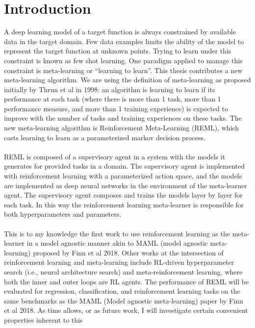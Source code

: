 \chapter{Introduction}
\label{Introduction}

\minitoc 
A deep learning model of a target function is always constrained by available data 
in the target domain. Few data examples limits the ability of the model to 
represent the target function at unknown points. Trying to learn under this 
constraint is known as few shot learning. One paradigm applied to manage this 
constraint is meta-learning or ``learning to learn''. This thesis contributes a 
new meta-learning algorithm. We are using the definition of meta-learning as 
proposed initially by Thrun et al in 1998: an algorithm is learning to learn if 
its performance at each task (where there is more than 1 task, more than 1 
performance measure, and more than 1 training experience) is expected to improve 
with the number of tasks and training experiences on these tasks. The new 
meta-learning algorithm is Reinforcement Meta-Learning (REML), which casts learning 
to learn as a parameterized markov decision process.
\\\\
REML is composed of a supervisory agent in a system with the models it generates 
for provided tasks in a domain. The supervisory agent is implemented with 
reinforcement learning with a parameterized action space, and the  models are 
implemented as deep neural networks in the environment of the meta-learner agent. 
The supervisory agent composes and trains the models layer by layer for each task. 
In this way the reinforcement learning meta-learner is responsible for both 
hyperparameters and parameters. 
\\\\
This is to my knowledge the first work to use reinforcement learning as the 
meta-learner in a model agnostic manner akin to MAML (model agnostic meta-learning) 
proposed by Finn et al 2018.  Other works at the intersection of reinforcement 
learning and meta-learning include RL-driven hyperparameter search (i.e., neural 
architecture search) and meta-reinforcement learning, where both the inner and outer 
loops are RL agents. The performance of REML will be evaluated for regression, 
classification, and reinforcement learning tasks on the same benchmarks as the MAML 
(Model agnostic meta-learning) paper by Finn et al 2018. As time allows, or as 
future work, I will investigate certain convenient properties inherent to this 
